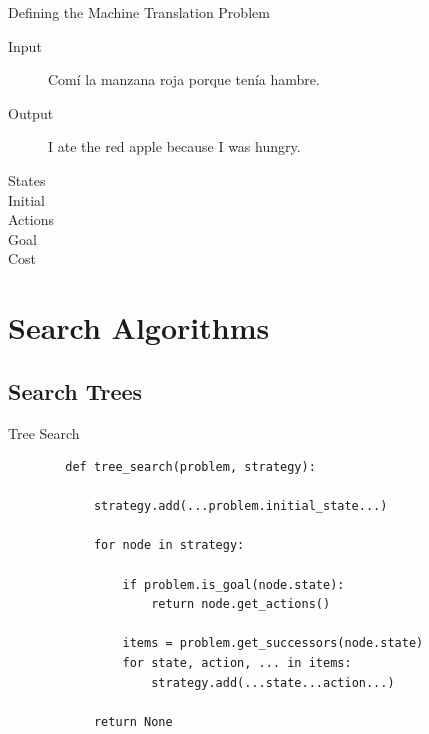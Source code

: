 \documentclass[14pt]{beamer}
\begin{document}
\begin{frame}{Defining the Machine Translation Problem}
	\begin{description}
		\item[Input] Com\'i la manzana roja porque ten\'ia hambre.
		\item[Output] I ate the red apple because I was hungry.
		\bigskip\bigskip
		\item[States]
		\item[Initial]
		\item[Actions]
		\item[Goal]
		\item[Cost]
	\end{description}
\end{frame}

\section{Search Algorithms}

\subsection{Search Trees}

\begin{frame}[fragile]{Tree Search}
	\footnotesize
	\begin{lstlisting}
		def tree_search(problem, strategy):

		    strategy.add(...problem.initial_state...)

		    for node in strategy:

		        if problem.is_goal(node.state):
		            return node.get_actions()

		        items = problem.get_successors(node.state)
		        for state, action, ... in items:
		            strategy.add(...state...action...)

		    return None
	\end{lstlisting}
\end{frame}
\end{document}
